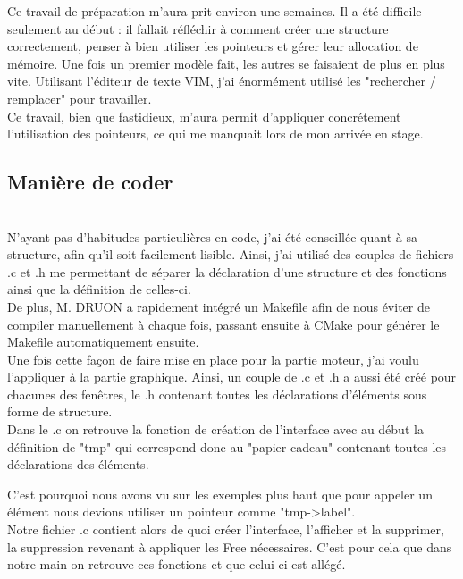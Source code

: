 \documentclass[11pt,french,a4paper]{report}
\begin{document}
Ce travail de préparation m'aura prit environ une semaines. Il a été difficile seulement au début : il fallait réfléchir 
à comment créer une structure correctement, penser à bien utiliser les pointeurs et gérer leur allocation de
mémoire. Une fois un premier modèle fait, les autres se faisaient de plus en plus vite. Utilisant l'éditeur de texte VIM, j'ai 
énormément utilisé les "rechercher / remplacer" pour travailler. \\
Ce travail, bien que fastidieux, m'aura permit d'appliquer concrétement l'utilisation des pointeurs, ce qui 
me manquait lors de mon arrivée en stage. \\ 

        \subsection{Manière de coder}\\
N'ayant pas d'habitudes particulières en code, j'ai été conseillée quant à sa structure, afin qu'il 
soit facilement lisible. Ainsi, j'ai utilisé des couples de fichiers .c et .h me permettant de séparer 
la déclaration d'une structure et des fonctions ainsi que la définition de celles-ci. \\ 

De plus, M. DRUON a rapidement intégré un Makefile afin de nous éviter de compiler manuellement à chaque fois, passant 
ensuite à CMake pour générer le Makefile automatiquement ensuite. \\


Une fois cette façon de faire mise en place pour la partie moteur, j'ai voulu l'appliquer à la partie
graphique. Ainsi, un couple de .c et .h a aussi été créé pour chacunes des fenêtres, le .h contenant 
toutes les déclarations d'éléments sous forme de structure. \\

Dans le .c on retrouve la fonction de création de l'interface avec au début la définition de "tmp" qui correspond donc 
au "papier cadeau" contenant toutes les déclarations des éléments. 

C'est pourquoi nous avons vu sur les exemples plus haut 
que pour appeler un élément nous devions utiliser un pointeur comme "tmp->label". \\

Notre fichier .c contient alors de quoi créer l'interface, l'afficher et la supprimer, la suppression revenant à appliquer les 
Free  nécessaires. C'est pour cela que dans notre main on retrouve ces fonctions et que celui-ci est allégé. \\
\\
\end{document}
